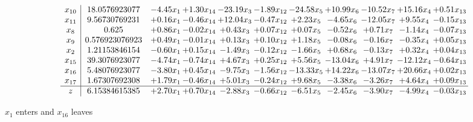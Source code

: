 \documentclass[9pt]{article}
\begin{document}
 \[\begin{array}{c| c c@{\hskip 2pt} c@{\hskip 2pt} c@{\hskip 2pt} c@{\hskip 2pt} c@{\hskip 2pt} c@{\hskip 2pt} c@{\hskip 2pt} c@{\hskip 2pt} c@{\hskip 2pt} }
 x_{10}   &  18.0576923077 & -4.45 x_{1} & +  1.30 x_{14} & -23.19 x_{3} & -1.89 x_{12} & -24.58 x_{5} & + 10.99 x_{6} & -10.52 x_{7} & + 15.16 x_{4} & +  0.51 x_{13}\\
 x_{11}   &  9.56730769231 & +  0.16 x_{1} & -0.46 x_{14} & + 12.04 x_{3} & -0.47 x_{12} & +  2.23 x_{5} & -4.65 x_{6} & -12.05 x_{7} & +  9.55 x_{4} & -0.15 x_{13}\\
 x_{8}   &  0.625 & +  0.86 x_{1} & -0.02 x_{14} & +  0.43 x_{3} & +  0.07 x_{12} & +  0.07 x_{5} & -0.52 x_{6} & +  0.71 x_{7} & -1.14 x_{4} & -0.07 x_{13}\\
 x_{9}   &  0.576923076923 & +  0.49 x_{1} & -0.01 x_{14} & +  0.13 x_{3} & +  0.10 x_{12} & +  1.18 x_{5} & -0.08 x_{6} & -0.16 x_{7} & -0.35 x_{4} & +  0.05 x_{13}\\
 x_{2}   &  1.21153846154 & -0.60 x_{1} & +  0.15 x_{14} & -1.49 x_{3} & -0.12 x_{12} & -1.66 x_{5} & +  0.68 x_{6} & -0.13 x_{7} & +  0.32 x_{4} & +  0.04 x_{13}\\
 x_{15}   &  39.3076923077 & -4.74 x_{1} & -0.74 x_{14} & +  4.67 x_{3} & +  0.25 x_{12} & +  5.56 x_{5} & -13.04 x_{6} & +  4.91 x_{7} & -12.12 x_{4} & -0.64 x_{13}\\
 x_{16}   &  5.48076923077 & -3.80 x_{1} & +  0.45 x_{14} & -9.75 x_{3} & -1.56 x_{12} & -13.33 x_{5} & + 14.22 x_{6} & -13.07 x_{7} & + 20.66 x_{4} & +  0.02 x_{13}\\
 x_{17}   &  1.67307692308 & +  1.79 x_{1} & -0.46 x_{14} & +  5.01 x_{3} & -0.24 x_{12} & +  9.68 x_{5} & -3.38 x_{6} & -3.26 x_{7} & +  4.64 x_{4} & +  0.09 x_{13}\\
\hline
z    &  6.15384615385 & +  2.70 x_{1} & +  0.70 x_{14} & -2.88 x_{3} & -0.66 x_{12} & -6.51 x_{5} & -2.45 x_{6} & -3.90 x_{7} & -4.99 x_{4} & -0.03 x_{13}\\
\end{array}\]


 $ x_{1} $ enters and $ x_{16} $ leaves 
\end{document}
